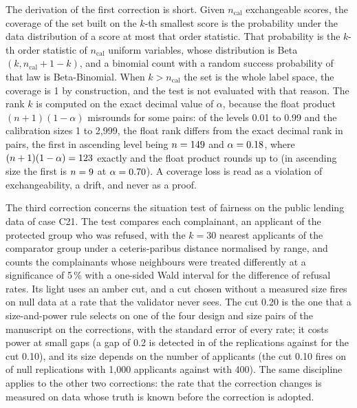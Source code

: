 The derivation of the first correction is short. Given $n_{\mathrm{cal}}$ exchangeable scores, the coverage of the set built on the $k$-th smallest score is the probability under the data distribution of a score at most that order statistic. That
probability is the $k$-th order statistic of $n_{\mathrm{cal}}$ uniform variables, whose distribution is Beta$(k,n_{\mathrm{cal}}+1-k)$, and a binomial count with a random success probability of that law is Beta-Binomial. When $k>n_{\mathrm{cal}}$ the set is the whole label
space, the coverage is 1 by construction, and the test is not evaluated with that reason. The rank $k$ is computed on the exact decimal value of $\alpha$, because the float product $(n+1)(1-\alpha)$ misrounds for some pairs: of the levels 0.01 to 0.99 and the calibration sizes 1 to 2,999,
the float rank differs from the exact decimal rank in \pxTenRankPairs{} pairs, the first in ascending level being $n=149{}$ and $\alpha=0.18{}$, where $(n+1)(1-\alpha)=123{}$ exactly and the float product rounds up to \pxTenRankFloat{} (in ascending size the first is $n=9{}$ at $\alpha=0.70{}$). A coverage loss is read as a violation of exchangeability, a drift, and never as a proof.

The third correction concerns the situation test of fairness on the public lending data of case C21. The test compares each complainant, an applicant of the protected group who was refused, with the $k=30$ nearest applicants of the comparator group
under a ceteris-paribus distance normalised by range, and counts the complainants whose neighbours were treated differently at a significance of 5\,\% with a one-sided Wald interval for the difference of refusal rates. Its light uses an amber cut, and a cut chosen without a measured
size fires on null data at a rate that the validator never sees. The cut 0.20 is the one that a size-and-power rule selects on one of the four design and size pairs of the manuscript on the corrections, with the standard error of every rate; it costs power at small gaps
(a gap of 0.2 is detected in \pxPpTenPowTwentyGapTwo{} of the replications against \pxPpTenPowTenGapTwo{} for the cut 0.10), and its size depends on the number of applicants (the cut 0.10 fires on \pxPpTenCutTenLarge{} of
null replications with 1,000 applicants against \pxPpTenCutTen{} with 400). The same discipline applies to the other two corrections: the rate that the correction changes is measured on data whose truth is known before the
correction is adopted.

